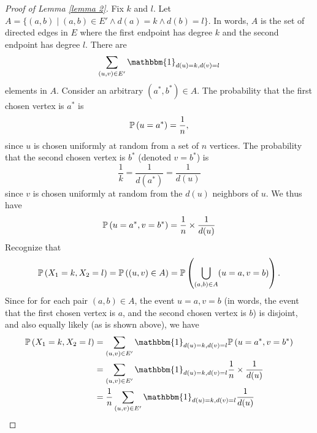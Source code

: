 \documentclass[12pt,reqno, a4]{amsart}
\begin{document}
\begin{proof}[Proof of Lemma \ref{lemma 2}]
    Fix $k$ and $l$. Let $A = \{(a,b) \mid (a,b) \in E' \land d(a) = k \land d(b) = l\}$. In words, $A$ is the set of directed edges in $E$ where the first endpoint has degree $k$ and the second endpoint has degree $l$.
    There are  
    \[
    \sum_{(u, v) \in E'} \mathbbm{1}_{d(u) = k, d(v) = l} 
    \] elements in $A$. Consider an arbitrary $(a^*, b^*) \in A$.  The probability that the first chosen vertex is $a^*$ is
    \[\mathbb{P}\left (u = a^* \right) = \frac{1}{n},
    \] since $u$ is chosen uniformly at random from a set of $n$ vertices. The probability that the second chosen vertex is $b^*$ (denoted $v = b^*$) is \[\frac{1}{k} = \frac{1}{d(a^*)} = \frac{1}{d(u)}\] since $v$ is chosen uniformly at random from the $d(u)$ neighbors of $u$. We thus have
    \[
    \mathbb{P}\left (u = a^*, v = b^* \right) = \frac{1}{n} \times \frac{1}{d(u)}
    \]
    Recognize that
    \[
    \mathbb{P}\left (X_1 = k, X_2 = l \right) = \mathbb{P}\left ((u,v) \in A \right) = \mathbb{P}\left (\bigcup_{(a,b) \in A} (u = a, v = b) \right).
    \]
    Since for for each pair $(a,b) \in A$, the event $u = a, v = b$ (in words, the event that the first chosen vertex is $a$, and the second chosen vertex is $b$) is disjoint, and also equally likely (as is shown above), we have
    \begin{align*}
            \pr{X_1 = k, X_2 = l} &= \sum_{(u, v) \in E'} \mathbbm{1}_{d(u) = k, d(v) = l} \pr{u = a^*, v = b^*}\\ &= \sum_{(u, v) \in E'} \mathbbm{1}_{d(u) = k, d(v) = l}  \frac{1}{n} \times \frac{1}{d(u)} \\& = \frac{1}{n} \sum_{(u, v) \in E'} \mathbbm{1}_{d(u) = k, d(v) = l} \frac{1}{d(u)}
    \end{align*}

\end{proof}
\end{document}
